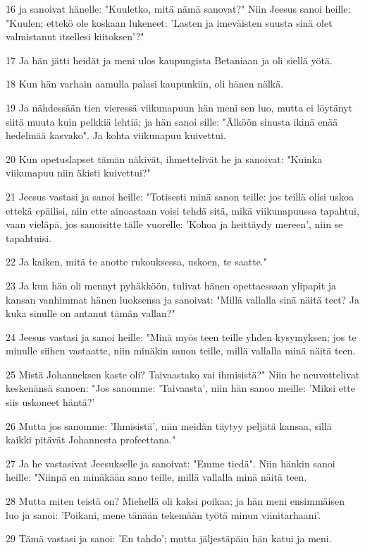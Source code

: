 \par 16 ja sanoivat hänelle: "Kuuletko, mitä nämä sanovat?" Niin Jeesus sanoi heille: "Kuulen; ettekö ole koskaan lukeneet: 'Lasten ja imeväisten suusta sinä olet valmistanut itsellesi kiitoksen'?"
\par 17 Ja hän jätti heidät ja meni ulos kaupungista Betaniaan ja oli siellä yötä.
\par 18 Kun hän varhain aamulla palasi kaupunkiin, oli hänen nälkä.
\par 19 Ja nähdessään tien vieressä viikunapuun hän meni sen luo, mutta ei löytänyt siitä muuta kuin pelkkiä lehtiä; ja hän sanoi sille: "Älköön sinusta ikinä enää hedelmää kasvako". Ja kohta viikunapuu kuivettui.
\par 20 Kun opetuslapset tämän näkivät, ihmettelivät he ja sanoivat: "Kuinka viikunapuu niin äkisti kuivettui?"
\par 21 Jeesus vastasi ja sanoi heille: "Totisesti minä sanon teille: jos teillä olisi uskoa ettekä epäilisi, niin ette ainoastaan voisi tehdä sitä, mikä viikunapuussa tapahtui, vaan vieläpä, jos sanoisitte tälle vuorelle: 'Kohoa ja heittäydy mereen', niin se tapahtuisi.
\par 22 Ja kaiken, mitä te anotte rukouksessa, uskoen, te saatte."
\par 23 Ja kun hän oli mennyt pyhäkköön, tulivat hänen opettaessaan ylipapit ja kansan vanhimmat hänen luoksensa ja sanoivat: "Millä vallalla sinä näitä teet? Ja kuka sinulle on antanut tämän vallan?"
\par 24 Jeesus vastasi ja sanoi heille: "Minä myös teen teille yhden kysymyksen; jos te minulle siihen vastaatte, niin minäkin sanon teille, millä vallalla minä näitä teen.
\par 25 Mistä Johanneksen kaste oli? Taivaastako vai ihmisistä?" Niin he neuvottelivat keskenänsä sanoen: "Jos sanomme: 'Taivaasta', niin hän sanoo meille: 'Miksi ette siis uskoneet häntä?'
\par 26 Mutta jos sanomme: 'Ihmisistä', niin meidän täytyy peljätä kansaa, sillä kaikki pitävät Johannesta profeettana."
\par 27 Ja he vastasivat Jeesukselle ja sanoivat: "Emme tiedä". Niin hänkin sanoi heille: "Niinpä en minäkään sano teille, millä vallalla minä näitä teen.
\par 28 Mutta miten teistä on? Miehellä oli kaksi poikaa; ja hän meni ensimmäisen luo ja sanoi: 'Poikani, mene tänään tekemään työtä minun viinitarhaani'.
\par 29 Tämä vastasi ja sanoi: 'En tahdo'; mutta jäljestäpäin hän katui ja meni.
